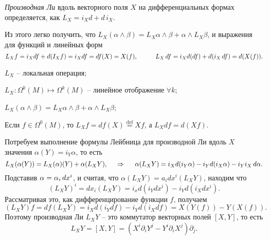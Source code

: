 \begin{to_def}
    \textit{Производная Ли} вдоль векторного поля $X$ на дифференциальных формах определяется, как $ L_X = i_X d + d \, i_X$.
\end{to_def}

Из этого легко получить, что $L_X (\alpha \wedge \beta) = L_X \alpha \wedge \beta + \alpha \wedge L_X \beta$, и выражения для функций и линейных форм
\begin{equation*}
    L_X f = i_X d f + d(I_X f) = i_X d f = df(X) = X(f), \hspace{1cm} L_X \, d f = i_X d (df) + d (i_X \, d f) = d(X(f)).
\end{equation*}

\begin{enumerate*}
    \item $L_X$ -- локальная операция;
    \item $L_X \colon \Omega^k (M) \mapsto \Omega^k(M)$ -- линейное отображение $\forall k$;
    \item $L_X (\alpha \wedge \beta) = L_X \alpha \wedge \beta + \alpha \wedge L_X \beta$;
    \item Если $f \in \Omega^0 (M)$, то $L_X f = df(X) \overset{\mathrm{def}}{=} Xf$, а $L_X df = d(Xf)$.
\end{enumerate*}


\begin{to_def}
    Потребуем выполнение формулы Лейбница для производной Ли вдоль $X$ значения $\alpha(Y) = i_Y \alpha$, то есть
    \begin{equation*}
        L_X (\alpha(Y)) = L_X(\alpha)(Y) + \alpha(L_X Y),
        \hspace{0.5cm} \Rightarrow \hspace{0.5cm} 
        \alpha(L_X Y) = i_X d(i_Y \alpha) - i_Y d (i_X \alpha) - i_Y i_X \, d \alpha.
    \end{equation*} 
    Подставив $\alpha = \alpha_i \, d x^i$, и считая, что $\alpha(L_X Y) = a_i dx^i (L_X Y)$, находим что
    \begin{equation*}
        (L_X Y)^i = dx_i(L_X Y) = i_x d(i_Y dx^i) - i_Y d(i_X dx^i).
    \end{equation*}    
    Рассматривая это, как дифференцирование функции $f$, получаем
\begin{equation*}
    (L_X Y) f = df (L_X Y) = i_X d(i_Y df) - i_Y d(i_X df) =X(Y(f)) - Y(X(f)).
\end{equation*}
    Поэтому производная Ли $L_X Y$ -- это коммутатор векторных полей $[X, Y]$, то есть 
\begin{equation*}
    L_X Y = [X, Y] = (X^i \partial_i Y^j - Y^i \partial_i X^j) \partial_j.
\end{equation*}
\end{to_def}


